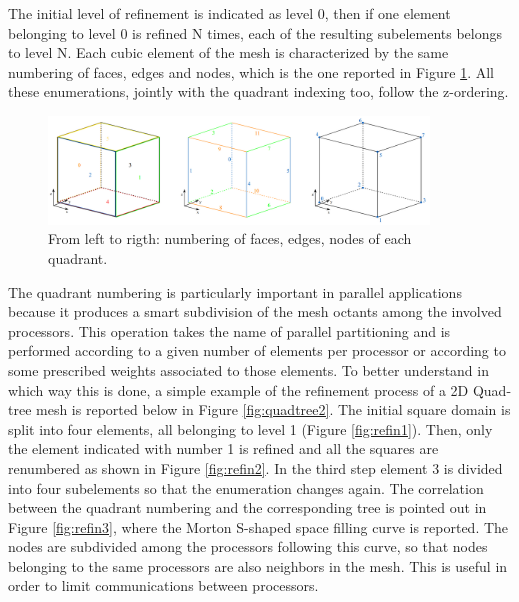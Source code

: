 \documentclass[11pt,a4paper]{article}
\begin{document}
The initial level of refinement is indicated as level 0, then if one element belonging to level 0 is refined N times, each of the resulting subelements belongs to level N. Each cubic element of the mesh is characterized by the same numbering of faces, edges and nodes, which is the one reported in Figure \ref{fig:quadtree}. All these enumerations, jointly with the quadrant indexing too, follow the z-ordering. \\

\begin{figure}[H]
    \centering
    \includegraphics[width=0.9\textwidth]{Images/enum.jpg}
    \caption{From left to rigth: numbering of faces, edges, nodes of each quadrant.}
    \label{fig:quadtree}
\end{figure}

The quadrant numbering is particularly important in parallel applications because it produces a smart subdivision of the mesh octants among the involved processors. This operation takes the name of parallel partitioning and is performed according to a given number of elements per processor or according to some prescribed
weights associated to those elements. To better understand in which way this is done, a simple example of the refinement process of a 2D Quad-tree mesh is reported below in Figure \ref{fig:quadtree2}. The initial square domain is split into four elements, all belonging to level 1 (Figure \ref{fig:refin1}). Then, only the element indicated with number 1 is refined and all the squares are renumbered as shown in Figure \ref{fig:refin2}. In the third step element 3 is divided into four subelements so that the enumeration changes again. The correlation between the quadrant numbering and the corresponding tree is pointed out in Figure \ref{fig:refin3}, where the Morton S-shaped space filling curve is reported. The nodes are subdivided among the processors following this curve, so that nodes belonging to the same processors are also neighbors in the mesh. This is useful in order to limit communications between processors.
\end{document}
